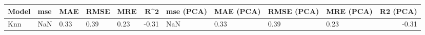 \begin{table}
\centering
\label{table:iri_reg_pred}
\begin{tabular}{lllllrllllr}
\toprule
\textbf{Model} & \textbf{mse} & \textbf{MAE} & \textbf{RMSE} & \textbf{MRE} & $\textbf{R^2}$ & \textbf{mse (PCA)} & \textbf{MAE (PCA)} & \textbf{RMSE (PCA)} & \textbf{MRE (PCA)} & \textbf{R2 (PCA)} \\
\midrule
           Knn &          NaN &         0.33 &          0.39 &         0.23 &          -0.31 &                NaN &               0.33 &                0.39 &               0.23 &             -0.31 \\
\bottomrule
\end{tabular}
\end{table}
